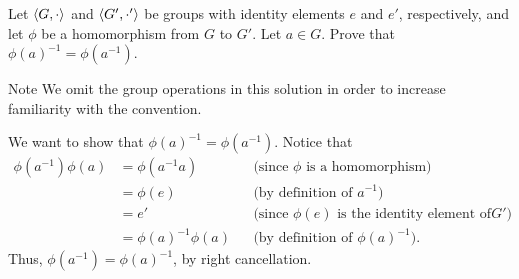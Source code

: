 \begin{exercise}[ID=3E,subtitle=(Extra Credit)]
 Let $\langle G,\cdot\rangle$ and $\langle G',\cdot'\rangle$ be groups with identity elements $e$ and $e'$, respectively, and let $\phi$ be a homomorphism from $G$ to $G'$. Let $a\in G$. Prove that $\phi(a)^{-1}=\phi(a^{-1})$.

\end{exercise}

\begin{solution}[print=false]

\begin{df}{Note}
We  omit the group operations in this solution in order to increase familiarity with the convention.\end{df}

We want to show that $\phi(a)^{-1}=\phi(a^{-1})$.
    Notice that
\begin{align*}
\phi(a^{-1})\phi(a)&=\phi(a^{-1}a)&&\text{(since $\phi$ is a homomorphism)}\\
&=\phi(e)&&\text{(by definition of $a^{-1}$)}\\
&=e'&& \text{(since $\phi(e)$ is the identity element of
$G'$)}\\
&=\phi(a)^{-1}\phi(a)&&\text{(by definition of $\phi(a)^{-1}$)}.
\end{align*}
Thus, $\phi(a^{-1})=\phi(a)^{-1}$, by right cancellation.
\end{solution} 